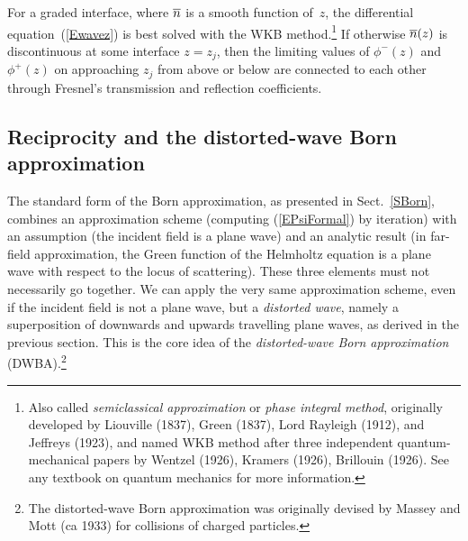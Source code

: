 For a graded interface, where $\overline{n}$ is a smooth function of~$z$,
the differential equation~(\ref{Ewavez}) is best solved
with the WKB method.\footnote
{Also called \textit{semiclassical approximation} or
\textit{phase integral method},
originally developed
by Liouville (1837), Green (1837), Lord Rayleigh (1912), and Jeffreys (1923),
and named WKB method after three independent
quantum-mechanical papers by
Wentzel (1926), Kramers (1926), Brillouin (1926).
See any textbook on quantum mechanics for more information.}
If otherwise $\overline{n}(z)$ is discontinuous at some interface $z=z_j$,
then the limiting values of $\phi^-(z)$ and $\phi^+(z)$
on approaching $z_j$ from above or below
are connected to each other through Fresnel's
transmission and reflection coefficients.

\subsection{Reciprocity and the distorted-wave Born approximation}


The standard form of the Born approximation,
as presented in Sect.~\ref{SBorn},
combines an approximation scheme
(computing (\ref{EPsiFormal}) by iteration)
with an assumption (the incident field is a plane wave)
and an analytic result
(in far-field approximation,
the Green function of the Helmholtz equation is a plane wave
with respect to the locus of scattering).
These three elements must not necessarily go together.
We can apply the very same approximation scheme,
even if the incident field is not a plane wave,
but a \textit{distorted wave},
namely a superposition of downwards and upwards travelling plane waves,
as derived in the previous section.
This is the core idea
of the \textit{distorted-wave Born approximation} (DWBA).\footnote
{The distorted-wave Born approximation
was originally devised by Massey and Mott (ca 1933)
for collisions of charged particles.}

